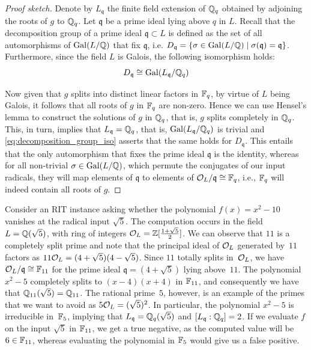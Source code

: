 \begin{proof}[Proof sketch]
Denote by $L_{\mathfrak{q}}$ the finite field extension of $\mathbb{Q}_q$ obtained by adjoining the roots of $g$ to $\mathbb{Q}_q$. Let $\mathfrak{q}$ be a prime ideal lying above $q$ in $L$.
	Recall that the decomposition group of a prime ideal $\mathfrak{q} \subset L$ is defined as the set of all automorphisms of $\operatorname{Gal}(L/\mathbb{Q})$ that fix $\mathfrak{q}$, i.e. $D_{\mathfrak{q}} = \{ \sigma \in \operatorname{Gal}(L/\mathbb{Q}) \mid \sigma(\mathfrak{q}) = \mathfrak{q}\}$. Furthermore, since the field $L$ is Galois, the following isomorphism holds:
\begin{equation}
\label{eq:decomposition_group_iso}
	D_{\mathfrak{q}} \cong \operatorname{Gal}(L_{\mathfrak{q}}/\mathbb{Q}_q)
\end{equation}

Now given that $g$ splits into distinct linear factors in $\mathbb{F}_q$, by virtue of $L$ being Galois, it follows that all roots of $g$ in $\mathbb{F}_q$ are non-zero. Hence we can use Hensel's lemma to construct the solutions of $g$ in $\mathbb{Q}_q$, that is, $g$ splits completely in $\mathbb{Q}_q$. This, in turn, implies that $L_{\mathfrak{q}} = \mathbb{Q}_q$, that is, $\operatorname{Gal}(L_{\mathfrak{q}}/\mathbb{Q}_q)$ is trivial and \eqref{eq:decomposition_group_iso} asserts that the same holds for $D_{\mathfrak{q}}$. This entails that the only automorphism that fixes the prime ideal $\mathfrak{q}$ is the identity, whereas for all non-trivial $\sigma\in\operatorname{Gal}(L/\mathbb{Q})$, which permute the conjugates of our input radicals, they will map elements of $\mathfrak{q}$ to elements of $\mathcal{O}_L/\mathfrak{q}\cong \mathbb{F}_q$, i.e., $\mathbb{F}_q$ will indeed contain all roots of $g$.
\end{proof}

\begin{example}
Consider an RIT instance asking whether the polynomial $f(x) = x^2 - 10$ vanishes at the radical input $\sqrt{5}$. The computation occurs in the field $L=\mathbb{Q}(\sqrt{5})$, with ring of integers $\mathcal{O}_L = \mathbb{Z}[\frac{1+\sqrt{5}}{2}]$.
	We can observe that $11$ is a completely split prime and note that the principal ideal of $\mathcal{O}_L$ generated by~$11$ factors as $11\mathcal{O}_L = (4+\sqrt{5}) (4-\sqrt{5})$.
Since  $11$ totally splits in~$\mathcal{O}_L$, we have $\mathcal{O}_L/\mathfrak{q} \cong \mathbb{F}_{11}$ for the prime ideal $\mathfrak{q}=(4+\sqrt{5})$ lying above~$11$.
The polynomial $x^2-5$  completely splits to  $(x-4)(x+4) $ in $\mathbb{F}_{11}$, and    consequently we have that $\mathbb{Q}_{11}(\sqrt{5}) = \mathbb{Q}_{11}$. 
	The rational prime~$5$, however, is an example of the primes that we want to avoid as $5\mathcal{O}_L = (\sqrt{5})^2$.
	 In particular, the polynomial $x^{2}-5$ is irreducible in~$\mathbb{F}_{5}$, implying that $L_{\mathfrak{q}} = \mathbb{Q}_q(\sqrt{5})$ and $[L_{\mathfrak{q}} : \mathbb{Q}_q] = 2$. If we evaluate $f$ on the input $\sqrt{5}$ in $\mathbb{F}_{11}$, we get a true negative, as the computed value will be $6\in\mathbb{F}_{11}$, whereas evaluating the polynomial in $\mathbb{F}_5$ would give us a false positive.
\end{example}


